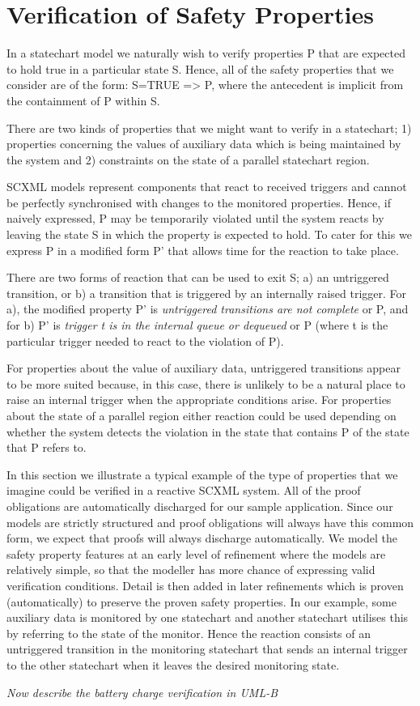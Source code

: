 

\section{Verification of Safety Properties}

In a statechart model we naturally wish to verify properties P that are expected to hold true in a particular state S.
Hence, all of the safety properties that we consider are of the form: S=TRUE => P, where the antecedent is implicit from the containment of P within S.

There are two kinds of properties that we might want to verify in a statechart;
1) properties concerning the values of auxiliary data which is being maintained by the system and 2) constraints on the state of a parallel statechart region.

SCXML models represent components that react to received triggers and cannot be perfectly synchronised with changes to the monitored properties. 
Hence, if naively expressed, P may be temporarily violated until the system reacts by leaving the state S in which the property is expected to hold.
To cater for this we express P in a modified form P' that allows time for the reaction to take place.

There are two forms of reaction that can be used to exit S; a) an untriggered transition, or b) a transition that is triggered by an internally raised trigger.
For a), the modified property P' is \emph{untriggered transitions are not complete} or P, and for b) P' is \emph{trigger t is in the internal queue or dequeued} or P (where t is the particular trigger needed to react to the violation of P).

For properties about the value of auxiliary data, untriggered transitions appear to be more suited because, in this case, there is unlikely to be a natural place to raise an internal trigger when the appropriate conditions arise.
For properties about the state of a parallel region either reaction could be used depending on whether the system detects the violation in the state that contains P of the state that P refers to.

In this section we illustrate a typical example of the type of properties that we imagine could be verified in a reactive SCXML system.
All of the proof obligations are automatically discharged for our sample application.
Since our models are strictly structured and proof obligations will always have this common form, we expect that proofs will always discharge automatically.
We model the safety property features at an early level of refinement where the models are relatively simple, so that the modeller has more chance of expressing valid verification conditions. 
Detail is then added in later refinements which is proven (automatically) to preserve the proven safety properties.
In our example, some auxiliary data is monitored by one statechart and another statechart utilises this by referring to the state of the monitor. 
Hence the reaction consists of an untriggered transition in the monitoring statechart that sends an internal trigger to the other statechart when it leaves the desired monitoring state.

\emph{Now describe the battery charge verification in UML-B}






